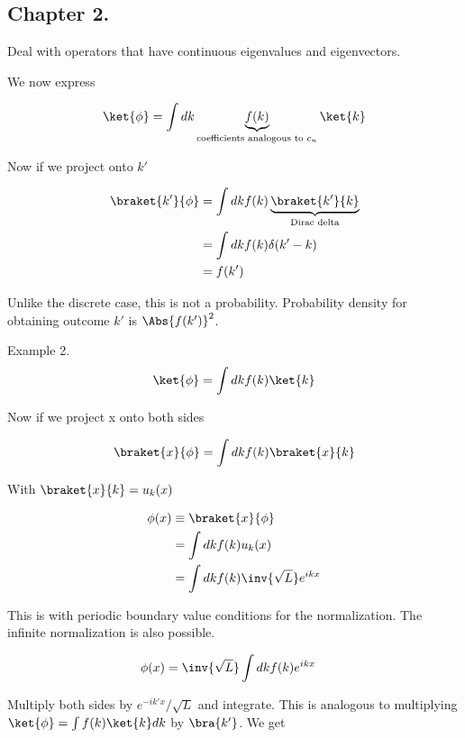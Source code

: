 \subsection{Chapter 2.}

Deal with operators that have continuous eigenvalues and eigenvectors.

We now express

\begin{align*}
\ket{\phi} = \int dk \underbrace{f(k)}_{\text{coefficients analogous to $c_n$}} \ket{k}
\end{align*}

Now if we project onto $k'$

\begin{align*}
\braket{k'}{\phi}
&= \int dk f(k) \underbrace{\braket{k'}{k}}_{\text{Dirac delta}} \\
&= \int dk f(k) \delta(k' -k) \\
&= f(k')
\end{align*}

Unlike the discrete case, this is not a probability.  Probability density for obtaining outcome $k'$ is $\Abs{f(k')}^2$.

Example 2.
\begin{align*}
\ket{\phi} = \int dk f(k) \ket{k}
\end{align*}

Now if we project x onto both sides

\begin{align*}
\braket{x}{\phi}
&= \int dk f(k) \braket{x}{k} \\
\end{align*}

With $\braket{x}{k} = u_k(x)$

\begin{align*}
\phi(x)
&\equiv \braket{x}{\phi} \\
&= \int dk f(k) u_k(x)  \\
&= \int dk f(k) \inv{\sqrt{L}} e^{ikx}
\end{align*}

This is with periodic boundary value conditions for the normalization.  The infinite normalization is also possible.

\begin{align*}
\phi(x)
&= \inv{\sqrt{L}} \int dk f(k) e^{ikx}
\end{align*}

Multiply both sides by $e^{-ik'x}/\sqrt{L}$ and integrate.  This is analogous to multiplying $\ket{\phi} = \int f(k) \ket{k} dk$ by $\bra{k'}$.  We get

